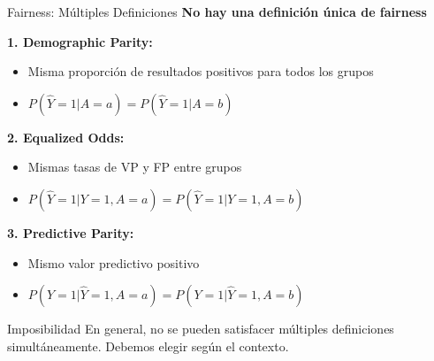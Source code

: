\documentclass[aspectratio=169]{beamer}
\begin{document}
\begin{frame}{Fairness: Múltiples Definiciones}
\textbf{No hay una definición única de fairness}

\vspace{0.3cm}

\textbf{1. Demographic Parity:}
\begin{itemize}
\item Misma proporción de resultados positivos para todos los grupos
\item $P(\hat{Y}=1 | A=a) = P(\hat{Y}=1 | A=b)$
\end{itemize}

\vspace{0.2cm}

\textbf{2. Equalized Odds:}
\begin{itemize}
\item Mismas tasas de VP y FP entre grupos
\item $P(\hat{Y}=1 | Y=1, A=a) = P(\hat{Y}=1 | Y=1, A=b)$
\end{itemize}

\vspace{0.2cm}

\textbf{3. Predictive Parity:}
\begin{itemize}
\item Mismo valor predictivo positivo
\item $P(Y=1 | \hat{Y}=1, A=a) = P(Y=1 | \hat{Y}=1, A=b)$
\end{itemize}

\vspace{0.3cm}

\begin{alertblock}{Imposibilidad}
En general, no se pueden satisfacer múltiples definiciones simultáneamente. Debemos elegir según el contexto.
\end{alertblock}
\end{frame}
\end{document}
